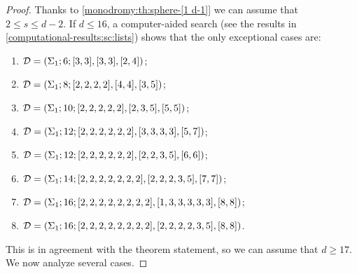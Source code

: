 \begin{proof}
Thanks to \cref{monodromy:th:sphere-[1 d-1]} we can assume that $2\le s\le d-2$. If $d\le 16$, a computer-aided search (see the results in \cref{computational-results:sc:lists}) shows that the only exceptional cases are:
\begin{enumerate}[(1)]
\item $\mathcal{D}=(\Sigma_{1};6;[3, 3],[3, 3],[2, 4])$;
\item $\mathcal{D}=(\Sigma_{1};8;[2, 2, 2, 2],[4, 4],[3, 5])$;
\item $\mathcal{D}=(\Sigma_{1};10;[2, 2, 2, 2, 2],[2, 3, 5],[5, 5])$;
\item $\mathcal{D}=(\Sigma_{1};12;[2, 2, 2, 2, 2, 2],[3, 3, 3, 3],[5, 7])$;
\item $\mathcal{D}=(\Sigma_{1};12;[2, 2, 2, 2, 2, 2],[2, 2, 3, 5],[6, 6])$;
\item $\mathcal{D}=(\Sigma_{1};14;[2, 2, 2, 2, 2, 2, 2],[2, 2, 2, 3, 5],[7, 7])$;
\item $\mathcal{D}=(\Sigma_{1};16;[2, 2, 2, 2, 2, 2, 2, 2],[1, 3, 3, 3, 3, 3],[8, 8])$;
\item $\mathcal{D}=(\Sigma_{1};16;[2, 2, 2, 2, 2, 2, 2, 2],[2, 2, 2, 2, 3, 5],[8, 8])$.

\end{enumerate}
This is in agreement with the theorem statement, so we can assume that $d\ge 17$. We now analyze several cases.

\end{proof}
